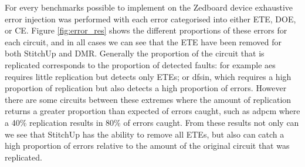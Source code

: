 For every benchmarks possible to implement on the Zedboard device
exhaustive error injection was performed with each error categorised into either ETE, DOE, or CE.
Figure \ref{fig:error_res} shows the different proportions of these errors for each circuit, and in
all cases we can see that the ETE have been removed for both StitchUp and DMR.
Generally the proportion of the circuit that is replicated corresponds to the proportion of detected faults: for example aes
requires little replication but detects only ETEs; or dfsin, which requires a high proportion
of replication but also detects a high proportion of errors.
However there are some circuits between these extremes where the amount of replication returns a greater
proportion than expected of errors caught, such as adpcm where a 40\% replication results in 80\% of errors caught.
From these results not only can we see that StitchUp has the ability to remove all ETEs, but also
can catch a high proportion of errors relative to the amount of the original circuit that was replicated.
